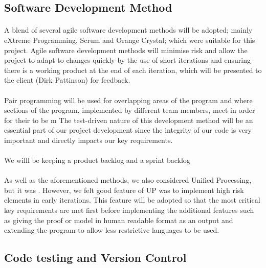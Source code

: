 \subsection{Software Development Method}

\paragraph{}
A blend of several agile software development methods will be adopted; mainly eXtreme Programming, Scrum and Orange Crystal; which were suitable for this project. Agile software development methods will minimise risk and allow the project to adapt to changes quickly by the use of short iterations and ensuring there is a working product at the end of each iteration, which will be presented to the client (Dirk Pattinson) for feedback.

\paragraph{}
Pair programming will be used for overlapping areas of the program and where sections of the program, implemented by different team members, meet in order for their to be m
The test-driven nature of this development method will be an essential part of our project development since the integrity of our code is very important and directly impacts our key requirements.

\paragraph{}
We willl be keeping a product backlog and a sprint backlog

\paragraph{}
As well as the aforementioned methods, we also considered Unified Processing, but it was .
However, we felt good feature of UP was to implement high risk elements in early iterations. This feature will be adopted so that the most critical key requirements are met first before implementing the additional features such as giving the proof or model in human readable format as an output and extending the program to allow less restrictive languages to be used.

\subsection{Code testing and Version Control}

